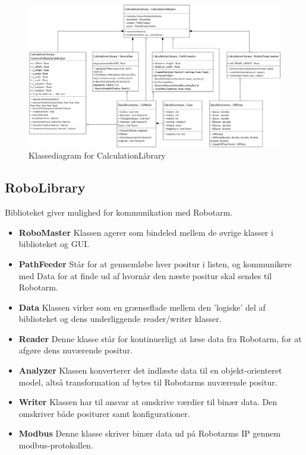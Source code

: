 \begin{figure}[H]
    \centering
    \includegraphics[width=1\textwidth]{figurer/d/Design/Class/uml_class_calculationlibrary}
    \caption{Klassediagram for CalculationLibrary}
    \label{class_ConversionLib}
\end{figure}
\newpage

\subsection{RoboLibrary}
Biblioteket giver mulighed for kommunikation med Robotarm.

\begin{itemize}
\item{\textbf{RoboMaster}}\newline
Klassen agerer som bindeled mellem de øvrige klasser i biblioteket og GUI.

\item{\textbf{PathFeeder}} \newline
Står for at gennemløbe hver positur i listen, og kommunikere med Data for at finde ud af hvornår den næste positur skal sendes til Robotarm.

\item{\textbf{Data}}\newline
Klassen virker som en grænseflade mellem den 'logiske' del af biblioteket og dens underliggende reader/writer klasser.

\item{\textbf{Reader}}\newline
Denne klasse står for kontinuerligt at læse data fra Robotarm, for at afgøre dens nuværende positur. 

\item{\textbf{Analyzer}} \newline
Klassen konverterer det indlæste data til en objekt-orienteret model, altså transformation af bytes til Robotarms nuværende positur.

\item{\textbf{Writer}}\newline
Klassen har til ansvar at omskrive værdier til binær data. Den omskriver både positurer samt konfigurationer.

\item{\textbf{Modbus}}\newline
Denne klasse skriver binær data ud på Robotarms IP gennem modbus-protokollen.
\end{itemize}

